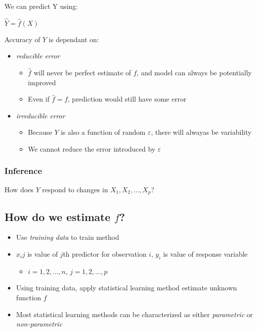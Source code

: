 \documentclass[]{book}
\providecommand{\tightlist}{%
  \setlength{\itemsep}{0pt}\setlength{\parskip}{0pt}}
\theoremstyle{definition}
\theoremstyle{definition}
\theoremstyle{definition}
\theoremstyle{remark}
\begin{document}
We can predict Y using:

\(\hat{Y} = \hat{f}(X)\)

Accuracy of \(Y\) is dependant on:

\begin{itemize}
\tightlist
\item
  \emph{reducible error}

  \begin{itemize}
  \tightlist
  \item
    \(\hat{f}\) will never be perfect estimate of \(f\), and model can
    always be potentially improved
  \item
    Even if \(\hat{f} = f\), prediction would still have some error
  \end{itemize}
\item
  \emph{irreducible error}

  \begin{itemize}
  \tightlist
  \item
    Because \(Y\) is also a function of random \(ε\), there will alwayas
    be variability
  \item
    We cannot reduce the error introduced by \(ε\)
  \end{itemize}
\end{itemize}

\subsubsection{Inference}\label{inference}

How does \(Y\) respond to changes in \(X_1, X_2, ..., X_p\)?

\subsection{\texorpdfstring{How do we estimate
\emph{\(f\)}?}{How do we estimate f?}}\label{how-do-we-estimate-f}

\begin{itemize}
\tightlist
\item
  Use \emph{training data} to train method
\item
  \(x_ij\) is value of \(j\)th predictor for observation \(i\), \(y_i\)
  is value of response variable

  \begin{itemize}
  \tightlist
  \item
    \(i = 1, 2, ..., n\), \(j = 1, 2, ..., p\)
  \end{itemize}
\item
  Using training data, apply statistical learning method estimate
  unknown function \(f\)
\item
  Most statistical learning methods can be characterized as either
  \emph{parametric} or \emph{non-parametric}
\end{itemize}
\end{document}
